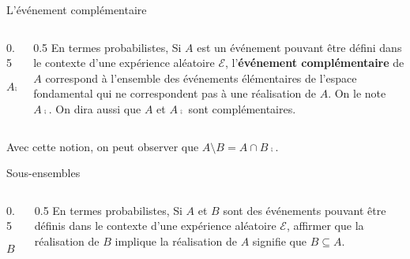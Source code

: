 \documentclass[nuit,charter,pied,handout]{BeamerJS}
\begin{document}
\begin{frame}[c]{L'événement complémentaire}
\pause
	\begin{columns}[c]
		\begin{column}{0.5\textwidth}
			\[A\comp=\Omega\setminus A\]
		\end{column}
		\begin{column}{0.5\textwidth}
			En termes probabilistes, Si $A$ est un événement pouvant être défini dans le contexte d'une expérience aléatoire $\mathcal{E}$, l'\textbf{événement complémentaire} de $A$ correspond à l'ensemble des événements élémentaires de l'espace fondamental qui ne correspondent pas à une réalisation de $A$. On le note $A\comp$. On dira aussi que $A$ et $A\comp$ sont complémentaires.
		\end{column}
	\end{columns}
	\pause
	\begin{lumiere}
		Avec cette notion, on peut observer que \(A\setminus B=A\cap B\comp\).
	\end{lumiere}
\end{frame}
\begin{frame}[t]{Sous-ensembles}
\pause
	\begin{columns}[c]
		\begin{column}{0.5\textwidth}
			\centering{}
			\[B\subseteq A\]
		\end{column}
		\pause
		\begin{column}{0.5\textwidth}
			En termes probabilistes, Si \(A\) et \(B\) sont des événements pouvant être définis dans le contexte d'une expérience aléatoire $\mathcal{E}$, affirmer que la réalisation de \(B\) implique la réalisation de \(A\) signifie que \(B\subseteq A\).
		\end{column}
	\end{columns}
\end{frame}
\end{document}

